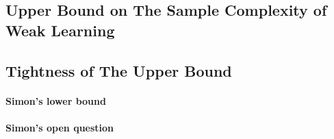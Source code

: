    



\subsection{Upper Bound on The Sample Complexity of Weak Learning}

\blindmathpaper

    



\subsection{Tightness of The Upper Bound}

\blindmathpaper

    


\paragraph{Simon's lower bound}

\blindmathpaper

    



\paragraph{Simon's open question}

\blindmathpaper

    



